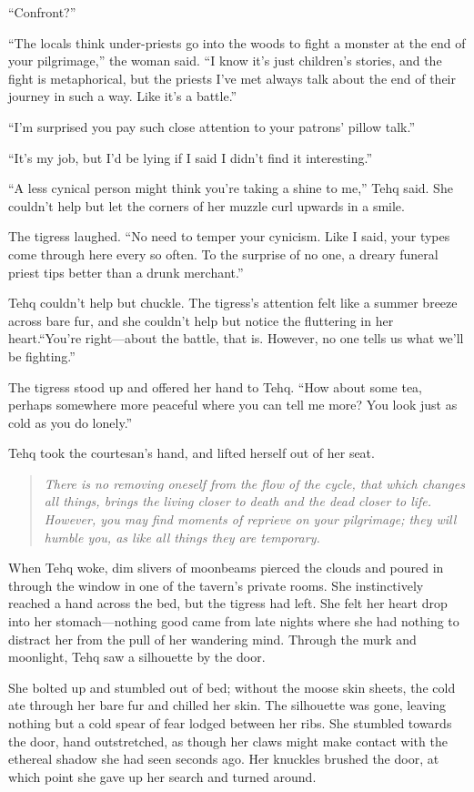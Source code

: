 ``Confront?''

``The locals think under-priests go into the woods to fight a monster at the end of your pilgrimage,'' the woman said. ``I know it's just children's stories, and the fight is metaphorical, but the priests I've met always talk about the end of their journey in such a way. Like it's a battle.''

``I'm surprised you pay such close attention to your patrons' pillow talk.''

``It's my job, but I'd be lying if I said I didn't find it interesting.''

``A less cynical person might think you're taking a shine to me,'' Tehq said. She couldn't help but let the corners of her muzzle curl upwards in a smile.

The tigress laughed. ``No need to temper your cynicism. Like I said, your types come through here every so often. To the surprise of no one, a dreary funeral priest tips better than a drunk merchant.''

Tehq couldn't help but chuckle. The tigress's attention felt like a summer breeze across bare fur, and she couldn't help but notice the fluttering in her heart.``You're right---about the battle, that is. However, no one tells us what we'll be fighting.''

The tigress stood up and offered her hand to Tehq. ``How about some tea, perhaps somewhere more peaceful where you can tell me more? You look just as cold as you do lonely.''

Tehq took the courtesan's hand, and lifted herself out of her seat.

\begin{quote}
\emph{There is no removing oneself from the flow of the cycle, that which changes all things, brings the living closer to death and the dead closer to life. However, you may find moments of reprieve on your pilgrimage; they will humble you, as like all things they are temporary.}
\end{quote}

When Tehq woke, dim slivers of moonbeams pierced the clouds and poured in through the window in one of the tavern's private rooms. She instinctively reached a hand across the bed, but the tigress had left. She felt her heart drop into her stomach---nothing good came from late nights where she had nothing to distract her from the pull of her wandering mind. Through the murk and moonlight, Tehq saw a silhouette by the door.

She bolted up and stumbled out of bed; without the moose skin sheets, the cold ate through her bare fur and chilled her skin. The silhouette was gone, leaving nothing but a cold spear of fear lodged between her ribs. She stumbled towards the door, hand outstretched, as though her claws might make contact with the ethereal shadow she had seen seconds ago. Her knuckles brushed the door, at which point she gave up her search and turned around.

